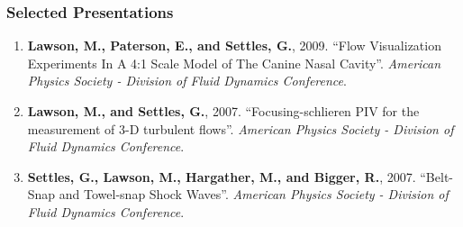 \subsubsection*{\large{Selected Presentations}}
\vspace{-0.15in}

\begin{enumerate}[leftmargin=1.5pc,itemsep=0pt,parsep=0pt,topsep=0pt,partopsep=1pt]

\item \textbf{Lawson, M., Paterson, E., and Settles, G.}, 2009. ``Flow Visualization Experiments In A 4:1 Scale Model of The Canine Nasal Cavity''. \emph{American Physics Society - Division of Fluid Dynamics Conference}.

\item \textbf{Lawson, M., and Settles, G.}, 2007. ``Focusing-schlieren PIV for the measurement of 3-D turbulent flows''. \emph{American Physics Society - Division of Fluid Dynamics Conference}.

\item \textbf{Settles, G., Lawson, M., Hargather, M., and Bigger, R.}, 2007. ``Belt-Snap and Towel-snap Shock Waves''. \emph{American Physics Society - Division of Fluid Dynamics Conference}.

\end{enumerate}

